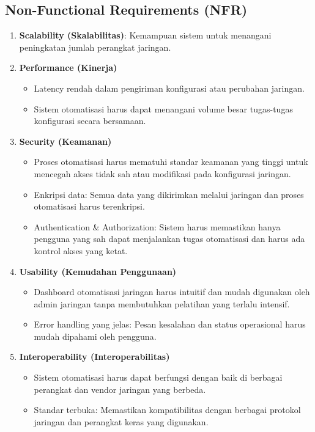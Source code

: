 \subsection{Non-Functional Requirements (NFR)}
\begin{enumerate}
    \item \textbf{Scalability (Skalabilitas)}: Kemampuan sistem untuk menangani peningkatan jumlah perangkat jaringan.
    
    \item \textbf{Performance (Kinerja)}
    \begin{itemize}
        \item Latency rendah dalam pengiriman konfigurasi atau perubahan jaringan.
        \item Sistem otomatisasi harus dapat menangani volume besar tugas-tugas konfigurasi secara bersamaan.
    \end{itemize}
    
    \item \textbf{Security (Keamanan)}
    \begin{itemize}
        \item Proses otomatisasi harus mematuhi standar keamanan yang tinggi untuk mencegah akses tidak sah atau modifikasi pada konfigurasi jaringan.
        \item Enkripsi data: Semua data yang dikirimkan melalui jaringan dan proses otomatisasi harus terenkripsi.
        \item Authentication \& Authorization: Sistem harus memastikan hanya pengguna yang sah dapat menjalankan tugas otomatisasi dan harus ada kontrol akses yang ketat.
    \end{itemize}
    
    \item \textbf{Usability (Kemudahan Penggunaan)}
    \begin{itemize}
        \item Dashboard otomatisasi jaringan harus intuitif dan mudah digunakan oleh admin jaringan tanpa membutuhkan pelatihan yang terlalu intensif.
        \item Error handling yang jelas: Pesan kesalahan dan status operasional harus mudah dipahami oleh pengguna.
    \end{itemize}
    
    \item \textbf{Interoperability (Interoperabilitas)}
    \begin{itemize}
        \item Sistem otomatisasi harus dapat berfungsi dengan baik di berbagai perangkat dan vendor jaringan yang berbeda.
        \item Standar terbuka: Memastikan kompatibilitas dengan berbagai protokol jaringan dan perangkat keras yang digunakan.
    \end{itemize}
    

\end{enumerate}
